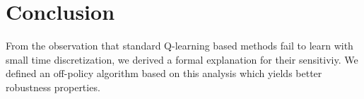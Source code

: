 \section{Conclusion}



From the observation that standard Q-learning based methods fail to learn with small time discretization,
we derived a formal explanation for their sensitiviy.
We defined an off-policy algorithm based on this analysis which yields better robustness properties.

